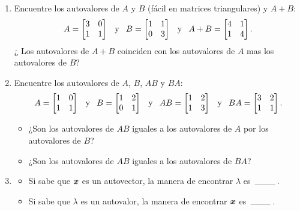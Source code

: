 \documentclass[12pt,a4paper]{article}
\newcommand{\bi}[1]{\hbox{\boldmath$#1$}}
\newcommand\1{\mbox{\,\vrule height-0.8pt depth1.0pt width2pc\,}}
\newcommand\2{\mbox{\,\vrule height-0.8pt depth1.0pt width1pc\,}}
\newcommand\og{\quad\hbox{y}\quad}
\newcommand{\la}{\lambda}
\begin{document}
\begin{enumerate}
\item Encuentre los autovalores de $A$ y $B$ (fácil en matrices triangulares) y $A+B$:
$$
A=\begin{bmatrix} 3&0\\ 1&1\end{bmatrix}\og
B=
\begin{bmatrix} 1&1\\ 0&3\end{bmatrix}
\og
A+B=\begin{bmatrix} 4&1\\ 1&4\end{bmatrix}.
$$
¿ Los autovalores de $A+B$ coinciden con los autovalores de $A$ mas los autovalores de $B$?

\item Encuentre los autovalores de $A$, $B$, $AB$ y $BA$:
\[
\def\quad{\hskip .8em}
A=\begin{bmatrix} 1&0\\ 1&1\end{bmatrix}\og
B=\begin{bmatrix} 1&2\\ 0&1\end{bmatrix}\og
AB=\begin{bmatrix} 1&2\\ 1&3\end{bmatrix}\og
BA=\begin{bmatrix} 3&2\\ 1&1\end{bmatrix}. \]
\begin{itemize}
	\item [(a)] ¿Son los autovalores de $AB$ iguales a los autovalores de $A$ por los autovalores de $B$?
	\item [(b)] ¿Son los autovalores de $AB$ iguales a los autovalores de $BA$?
	\end{itemize}

\item
\begin{itemize}
\item[(a)] Si sabe que $\bi x$ es un autovector, la manera de encontrar $\la$ es $\1$.
\item[(b)] Si sabe que $\la$ es un autovalor, la manera de encontrar  $\bi x$ es $\1$.
\end{itemize}


\end{enumerate}
\end{document}
